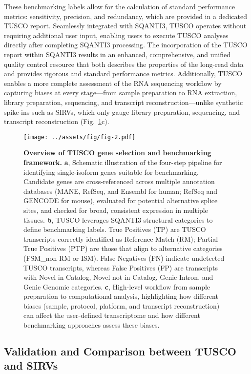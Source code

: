 \documentclass[pdflatex,sn-nature]{sn-jnl}%
\begin{document}
These benchmarking labels allow for the calculation of standard performance metrics: sensitivity, precision, and redundancy, which are provided in a dedicated TUSCO report. Seamlessly integrated with SQANTI3, TUSCO operates without requiring additional user input, enabling users to execute TUSCO analyses directly after completing SQANTI3 processing. The incorporation of the TUSCO report within SQANTI3 results in an enhanced, comprehensive, and unified quality control resource that both describes the properties of the long-read data and provides rigorous and standard performance metrics. Additionally, TUSCO enables a more complete assessment of the RNA sequencing workflow by capturing biases at every stage---from sample preparation to RNA extraction, library preparation, sequencing, and transcript reconstruction---unlike synthetic spike-ins such as SIRVs, which only gauge library preparation, sequencing, and transcript reconstruction (Fig.~\ref{fig:figure2}c).


\begin{figure}[p]
    \centering
    \texttt{[image: ../assets/fig/fig-2.pdf]}
    \caption{\textbf{Overview of TUSCO gene selection and benchmarking framework.} \textbf{a}, Schematic illustration of the four-step pipeline for identifying single-isoform genes suitable for benchmarking. Candidate genes are cross-referenced across multiple annotation databases (MANE, RefSeq, and Ensembl for human; RefSeq and GENCODE for mouse), evaluated for potential alternative splice sites, and checked for broad, consistent expression in multiple tissues. \textbf{b}, TUSCO leverages SQANTI3 structural categories to define benchmarking labels. True Positives (TP) are TUSCO transcripts correctly identified as Reference Match (RM); Partial True Positives (PTP) are those that align to alternative categories (FSM\_non-RM or ISM). False Negatives (FN) indicate undetected TUSCO transcripts, whereas False Positives (FP) are transcripts with Novel in Catalog, Novel not in Catalog, Genic Intron, and Genic Genomic categories. \textbf{c}, High-level workflow from sample preparation to computational analysis, highlighting how different biases (sample, protocol, platform, and transcript reconstruction) can affect the user-defined transcriptome and how different benchmarking approaches assess these biases.}
    \label{fig:figure2}
\end{figure}

\subsection{Validation and Comparison between TUSCO and SIRVs}
\end{document}
